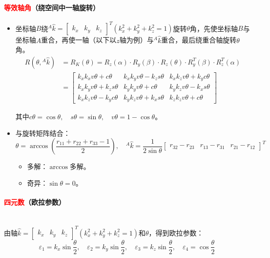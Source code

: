 \documentclass[
12pt, %
a4paper, 
oneside, %
]{scrartcl}
\begin{document}
\paragraph{\textcolor{red}{等效轴角}（绕空间中一轴旋转）}
\begin{itemize}
\item 坐标轴$ B $绕$ {}^A \hat{k} = \begin{bmatrix} k_x & k_y & k_z \end{bmatrix}^T (k_x^2 + k_y^2 + k_z^2 = 1) $旋转$ \theta $角，先使坐标轴$ B $与坐标轴$ A $重合，再使一轴（以下以$ z $轴为例）与$ ^A \hat{k} $重合，最后绕重合轴旋转$ \theta $角。
\begin{align*}
R(\theta, {}^A \hat{k}) &= R_K(\theta) = R_z(\alpha) \cdot R_y(\beta) \cdot R_z(\theta) \cdot R_y^T(\beta) \cdot R_z^T(\alpha) \\
&= \begin{bmatrix} k_x k_x v\theta + c\theta & k_x k_y v\theta - k_z s\theta & k_x k_z v\theta + k_y c\theta \\ k_x k_y v\theta + k_z s\theta & k_y k_y v\theta + c\theta & k_y k_z v\theta - k_x s\theta \\ k_x k_z v\theta - k_y c\theta & k_y k_z v\theta + k_x s\theta & k_z k_z v\theta + c\theta \end{bmatrix} 
\end{align*}

其中$ c\theta = \cos\theta, \quad s\theta = \sin\theta, \quad v\theta = 1 - \cos\theta $。
\item 与旋转矩阵结合：
$$ \theta = \arccos(\frac{r_{11} + r_{22} + r_{33} - 1}{2}), \quad {}^A \hat{k} = \frac{1}{2 \sin\theta} \begin{bmatrix} r_{32} - r_{23} & r_{13} - r_{31} & r_{21} - r_{12} \end{bmatrix}^T $$
\begin{itemize}
\item 多解：$ \arccos $多解。    
\item 奇异：$ \sin\theta = 0 $。
\end{itemize}
\end{itemize}
\paragraph{\textcolor{red}{四元数}（欧拉参数）}~\\

由轴$ \hat{k} = \begin{bmatrix} k_x & k_y & k_z \end{bmatrix}^T (k_x^2 + k_y^2 + k_z^2 = 1) $和$ \theta $，得到欧拉参数：
$$ \varepsilon_1 = k_x \sin\frac{\theta}{2}, \quad \varepsilon_2 = k_y \sin\frac{\theta}{2}, \quad \varepsilon_3 = k_z \sin\frac{\theta}{2}, \quad \varepsilon_4 = \cos\frac{\theta}{2} $$
\end{document}
